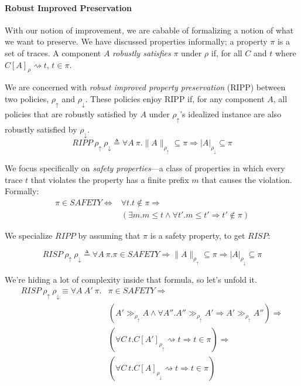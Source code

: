\documentclass{article}
\begin{document}
\paragraph{Robust Improved Preservation}

With our notion of improvement, we are cabable of formalizing a notion of what
we want to preserve. We have discussed properties informally;
a property \(\pi\) is a set of traces. A component \(A\) {\em robustly satisfies}
\(\pi\) under \(\rho\) if, for all \(C\) and \(t\) where \(C[A]_\rho \rightsquigarrow t\),
\(t \in \pi\).

We are concerned with {\em robust improved property preservation} (RIPP) between two
policies, \(\rho_\uparrow\) and \(\rho_\downarrow\). These policies enjoy RIPP if,
for any component \(A\), all policies that are robustly satisfied by \(A\) under
\(\rho_\uparrow\)'s idealized instance are also robustly satisfied by \(\rho_\downarrow\).
%
\[RIPP ~ \rho_\uparrow ~ \rho_\downarrow \triangleq \forall A ~ \pi.\|A\|_{\rho_\uparrow} \subseteq \pi \Rightarrow |A|_{\rho_\downarrow} \subseteq \pi\]

We focus specifically on {\em safety properties}---a class of properties in which every
trace \(t\) that violates the property has a finite prefix \(m\) that causes the violation.
Formally:
\[\begin{split}
\pi \in \mathit{SAFETY} \Leftrightarrow & \forall t . t \not \in \pi \Rightarrow \\
& (\exists m . m \leq t \land \forall t' . m \leq t' \Rightarrow t' \not \in \pi)
\end{split}\]

We specialize \(RIPP\) by assuming that \(\pi\) is a safety property, to get
\(RISP\):

\[RISP ~ \rho_\uparrow ~ \rho_\downarrow \triangleq \forall A ~ \pi.\pi \in \mathit{SAFETY} \Rightarrow \|A\|_{\rho_\uparrow} \subseteq \pi \Rightarrow |A|_{\rho_\downarrow} \subseteq \pi \]

We're hiding a lot of complexity inside that formula, so let's unfold it.
%
\[\begin{split}
RISP ~ \rho_\uparrow ~ \rho_\downarrow \equiv \forall A ~ A' ~ \pi . & \pi \in \mathit{SAFETY} \Rightarrow \\
& (A' \gg_{\rho_\uparrow} A \land
\forall A'' . A'' \gg_{\rho_\uparrow} A' \Rightarrow A' \gg_{\rho_\uparrow} A'') \Rightarrow \\
& (\forall C ~ t . C[A']_{\rho_\uparrow} \rightsquigarrow t \Rightarrow t \in \pi) \Rightarrow \\
& (\forall C ~ t . C[A]_{\rho_\downarrow} \rightsquigarrow t \Rightarrow t \in \pi)
\end{split}\]
\end{document}
